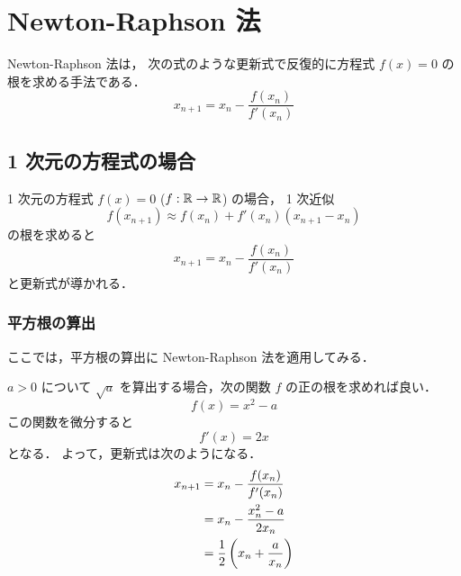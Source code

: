 %

\chapter{Newton-Raphson 法}\label{chap:root-finding_newton-raphson}

Newton-Raphson 法は，
次の式のような更新式で反復的に方程式 $f(x) = 0$ の根を求める手法である．
\begin{equation}
    x_{n+1} = x_n - \frac{f(x_n)}{f'(x_n)}
\end{equation}

\section{1 次元の方程式の場合}

1 次元の方程式 $f(x) = 0$ ($f: \mathbb{R} \to \mathbb{R}$) の場合，
1 次近似
\begin{equation}
    f(x_{n+1}) \approx f(x_n) + f'(x_n) (x_{n+1} - x_n)
\end{equation}
の根を求めると
\begin{equation}
    x_{n+1} = x_n - \frac{f(x_n)}{f'(x_n)}
    \label{eq:root-finding_newton-raphson_one-dim-update-law}
\end{equation}
と更新式が導かれる．

\subsection{平方根の算出}

ここでは，平方根の算出に Newton-Raphson 法を適用してみる．

$a>0$ について $\sqrt{a}$ を算出する場合，次の関数 $f$ の正の根を求めれば良い．
\begin{equation}
    f(x) = x^2 - a
\end{equation}
この関数を微分すると
\begin{equation}
    f'(x) = 2x
\end{equation}
となる．
よって，更新式は次のようになる．
\begin{align}
    x_{n+1} & = x_n - \frac{f(x_n)}{f'(x_n)}          \notag \\
            & = x_n - \frac{x_n^2 - a}{2x_n}          \notag \\
            & = \frac{1}{2}\left(x_n + \frac{a}{x_n}\right)
    \label{eq:root-finding_newton-raphson_sqrt-update-law}
\end{align}

